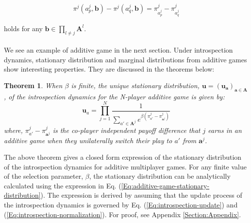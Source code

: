 \documentclass[11pt]{article}
\theoremstyle{plainCl1}
\newtheorem{theorem}{Theorem}
\theoremstyle{plainCl2}
\newcommand{\A}{\mathbf{A}}
\newcommand{\abf}{\mathbf{a}}
\newcommand{\ubf}{\mathbf{u}}
\begin{document}
\begin{equation}
\pi^j(a^j_p, \mathbf{b}) - \pi^j(a^j_q, \mathbf{b}) = \pi^j_{a^j_p} - \pi^j_{a^j_q}
\label{Eq:additive games property}
\end{equation}

\noindent holds for any $\mathbf{b} \in \prod_{l \neq j} \A^l$. 
\\ \\
We see an example of additive game in the next section. Under introspection dynamics, stationary distribution and marginal distributions from additive games show interesting properties. They are discussed in the theorems below: 

\begin{theorem}
When $\beta$ is finite, the unique stationary distribution, $\ubf = (\ubf_\abf)_{\abf \in \A}$, of the introspection dynamics for the N-player additive game is given by: 
\begin{equation}
\ubf_a = \prod_{j=1}^N \frac{1}{\displaystyle \sum_{a' \in \A^j} e^{\beta \left( \pi^j_{a'} -  \pi^j_{\abf^j} \right) }} 
\label{Eq:additive-game-stationary-distribution}
\end{equation}
where, $\pi^j_{a'} - \pi^j_{\abf^j}$ is the co-player independent payoff difference that $j$  earns in an additive game when they unilaterally switch their play to $a'$ from $\abf^j$.
\label{Th:additive-games-stationary-dist}
\end{theorem}
\noindent The above theorem gives a closed form expression of the stationary distribution of the introspection dynamics for additive multiplayer games. For any finite value of the selection parameter, $\beta$, the stationary distribution can be analytically calculated using the expression in Eq. (\ref{Eq:additive-game-stationary-distribution}). The expression is derived by assuming that the update process of the introspection dynamics is governed by Eq. (\ref{Eq:introspection-update}) and (\ref{Eq:introspection-normalization}). For proof, see Appendix \ref{Section:Appendix}.
\end{document}
